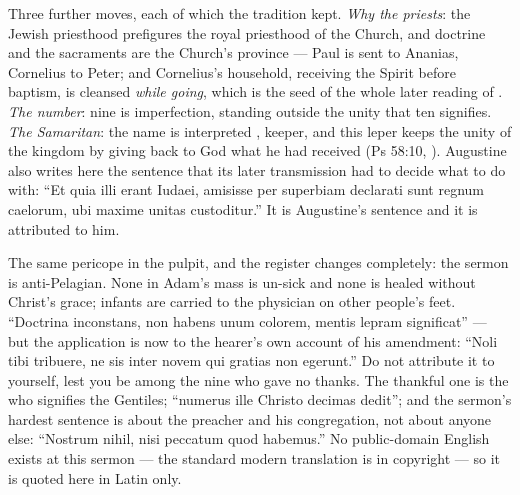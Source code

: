 \begin{witnessnote}
Three further moves, each of which the tradition kept. \textit{Why the
priests}: the Jewish priesthood prefigures the royal priesthood of the Church,
and doctrine and the sacraments are the Church's province --- Paul is sent to
Ananias, Cornelius to Peter; and Cornelius's household, receiving the Spirit
before baptism, is cleansed \textit{while going}, which is the seed of the
whole later reading of . \textit{The number}: nine is
imperfection, standing outside the unity that ten signifies. \textit{The
Samaritan}: the name is interpreted , keeper, and this leper
keeps the unity of the kingdom by giving back to God what he had received
(Ps 58:10, ). Augustine also writes
here the sentence that its later transmission had to decide what to do with:
``Et quia illi erant Iudaei, amisisse per superbiam declarati sunt regnum
caelorum, ubi maxime unitas custoditur.'' It is Augustine's sentence and it is
attributed to him.
\end{witnessnote}

\begin{witnessnote}
The same pericope in the pulpit, and the register changes completely: the
sermon is anti-Pelagian. None in Adam's mass is un-sick and none is healed
without Christ's grace; infants are carried to the physician on other people's
feet. ``Doctrina inconstans, non habens unum colorem, mentis lepram
significat'' --- but the application is now to the hearer's own account of his
amendment: ``Noli tibi tribuere, ne sis inter novem qui gratias non egerunt.''
Do not attribute it to yourself, lest you be among the nine who gave no
thanks. The thankful one is the  who signifies the Gentiles;
``numerus ille Christo decimas dedit''; and the sermon's hardest sentence is
about the preacher and his congregation, not about anyone else: ``Nostrum
nihil, nisi peccatum quod habemus.'' No public-domain English exists at this
sermon --- the standard modern translation is in copyright --- so it is quoted
here in Latin only.
\end{witnessnote}

